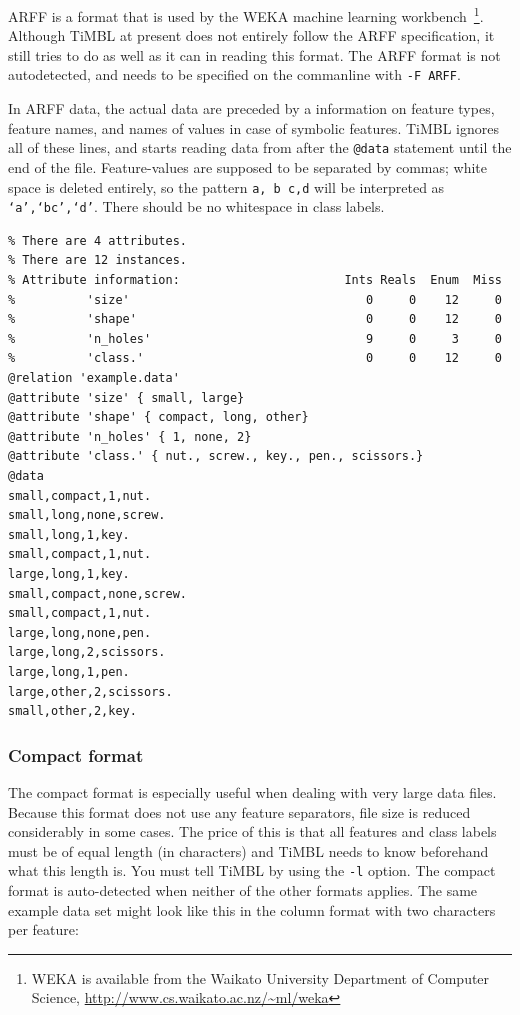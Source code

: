 \documentclass{book}
\begin{document}
ARFF is a format that is used by the WEKA machine learning
workbench~\cite{Garner95,Witten+99}\footnote{WEKA is available from
  the Waikato University Department of Computer Science,
  \url{http://www.cs.waikato.ac.nz/~ml/weka}}.  Although TiMBL at
present does not entirely follow the ARFF specification, it
still tries to do as well as it can in reading this format. The ARFF
format is not autodetected, and needs to be specified on the
commanline with {\tt -F ARFF}.

In ARFF data, the actual data are preceded by a information on feature
types, feature names, and names of values in case of symbolic
features. TiMBL ignores all of these lines, and starts reading data
from after the {\tt @data} statement until the end of the
file. Feature-values are supposed to be separated by commas; white
space is deleted entirely, so the pattern {\tt a, b c,d} will be
interpreted as {\tt `a',`bc',`d'}. There should be no whitespace in
class labels.

\begin{footnotesize}
\begin{verbatim}
% There are 4 attributes.
% There are 12 instances.
% Attribute information:                       Ints Reals  Enum  Miss
%          'size'                                 0     0    12     0
%          'shape'                                0     0    12     0
%          'n_holes'                              9     0     3     0
%          'class.'                               0     0    12     0
@relation 'example.data'
@attribute 'size' { small, large}
@attribute 'shape' { compact, long, other}
@attribute 'n_holes' { 1, none, 2}
@attribute 'class.' { nut., screw., key., pen., scissors.}
@data
small,compact,1,nut.
small,long,none,screw.
small,long,1,key.
small,compact,1,nut.
large,long,1,key.
small,compact,none,screw.
small,compact,1,nut.
large,long,none,pen.
large,long,2,scissors.
large,long,1,pen.
large,other,2,scissors.
small,other,2,key.
\end{verbatim}
\end{footnotesize}

\subsubsection{Compact format}
\label{compactformat}

The compact format is especially useful when dealing with very large
data files. Because this format does not use any feature separators,
file size is reduced considerably in some cases. The price of this is
that all features and class labels must be of equal length (in
characters) and TiMBL needs to know beforehand what this length
is. You must tell TiMBL by using the {\tt -l} option. The compact
format is auto-detected when neither of the other formats applies. The
same example data set might look like this in the column format with
two characters per feature:
\end{document}
